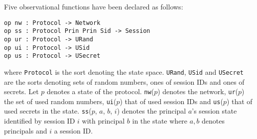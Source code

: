 \documentclass[a4paper,fleqn]{cas-dc}
\begin{document}
Five observational functions have been declared as follows:
\begin{small}
\begin{verbatim}
op nw : Protocol -> Network
op ss : Protocol Prin Prin Sid -> Session
op ur : Protocol -> URand
op ui : Protocol -> USid
op us : Protocol -> USecret
\end{verbatim}
\end{small}	
where \verb!Protocol! is  the  sort  denoting  the  state  space. \verb!URand!, \verb!USid! and \verb!USecret! are the  sorts denoting sets of random numbers, ones of session IDs and ones of secrets. 
Let $p$ denotes a state of the protocol. \verb!nw!($p$) denotes the network, \verb!ur!($p$) the set of used random numbers, \verb!ui!($p$) that of used session IDs and \verb!us!($p$) that of used secrets in the state. 
\verb!ss!($p$, $a$, $b$, $i$) denotes the principal $a$’s session state identified by session ID $i$ with principal $b$ in the state where $a, b$ denotes principals and $i$ a session ID.
\end{document}
